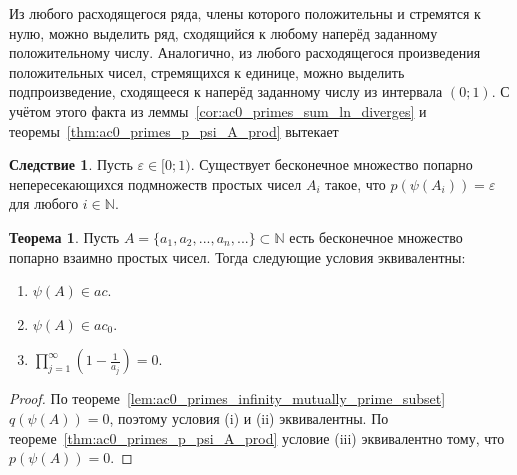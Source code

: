 \documentclass[a4paper,openbib]{article}
\theoremstyle{definition}
\newtheorem{theorem}[lemma]{Теорема}
\newtheorem{corollary}{Следствие}[lemma]
\begin{document}
Из любого расходящегося ряда, члены которого положительны и стремятся к нулю,
можно выделить ряд, сходящийся к любому наперёд заданному положительному числу.
Аналогично, из любого расходящегося произведения положительных чисел, стремящихся к единице, можно выделить
подпроизведение, сходящееся к наперёд заданному числу из интервала $(0;1)$.
С учётом этого факта
из леммы~\ref{cor:ac0_primes_sum_ln_diverges} и теоремы~\ref{thm:ac0_primes_p_psi_A_prod} вытекает
\begin{corollary}
	Пусть $\varepsilon \in {[} 0; 1)$.
	Существует бесконечное множество попарно непересекающихся подмножеств простых чисел
	$A_i$ такое, что $p(\psi(A_i))=\varepsilon$ для любого $i\in\mathbb{N}$.
\end{corollary}

%

\begin{theorem}
	Пусть $A=\{a_1, a_2, ..., a_n, ...\}\subset\mathbb{N}$ есть бесконечное множество попарно взаимно простых чисел.
	Тогда следующие условия эквивалентны:
	\begin{enumerate}[label=(\roman*)]
		\item
			$\psi(A)\in ac$.
		\item
			$\psi(A)\in ac_0$.
		\item
			$\prod_{j=1}^\infty \left(1-\frac{1}{a_j}\right) = 0$.
	\end{enumerate}
\end{theorem}

\begin{proof}
	По теореме~\ref{lem:ac0_primes_infinity_mutually_prime_subset} $q(\psi(A))=0$,
	поэтому условия (i) и (ii) эквивалентны.
	По теореме~\ref{thm:ac0_primes_p_psi_A_prod} условие (iii) эквивалентно тому, что $p(\psi(A))=0$.
\end{proof}



\printbibliography{}
\end{document}
